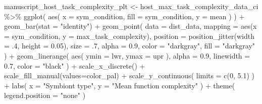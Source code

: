 \documentclass[
]{book}
\newenvironment{Shaded}{\begin{snugshade}}{\end{snugshade}}
\newcommand{\AttributeTok}[1]{\textcolor[rgb]{0.77,0.63,0.00}{#1}}
\newcommand{\DecValTok}[1]{\textcolor[rgb]{0.00,0.00,0.81}{#1}}
\newcommand{\FloatTok}[1]{\textcolor[rgb]{0.00,0.00,0.81}{#1}}
\newcommand{\FunctionTok}[1]{\textcolor[rgb]{0.00,0.00,0.00}{#1}}
\newcommand{\NormalTok}[1]{#1}
\newcommand{\OtherTok}[1]{\textcolor[rgb]{0.56,0.35,0.01}{#1}}
\newcommand{\SpecialCharTok}[1]{\textcolor[rgb]{0.00,0.00,0.00}{#1}}
\newcommand{\StringTok}[1]{\textcolor[rgb]{0.31,0.60,0.02}{#1}}
\begin{document}
\begin{Shaded}
\begin{Highlighting}[]
\NormalTok{manuscript\_host\_task\_complexity\_plt }\OtherTok{\textless{}{-}}\NormalTok{ host\_max\_task\_complexity\_data\_ci }\SpecialCharTok{\%\textgreater{}\%}
  \FunctionTok{ggplot}\NormalTok{(}
    \FunctionTok{aes}\NormalTok{(}
      \AttributeTok{x =}\NormalTok{ sym\_condition,}
      \AttributeTok{fill =}\NormalTok{ sym\_condition,}
      \AttributeTok{y =}\NormalTok{ mean}
\NormalTok{    )}
\NormalTok{  ) }\SpecialCharTok{+}
  \FunctionTok{geom\_bar}\NormalTok{(}\AttributeTok{stat =} \StringTok{"identity"}\NormalTok{) }\SpecialCharTok{+}
  \FunctionTok{geom\_point}\NormalTok{(}
    \AttributeTok{data =}\NormalTok{ dist\_data,}
    \AttributeTok{mapping =} \FunctionTok{aes}\NormalTok{(}\AttributeTok{x =}\NormalTok{ sym\_condition, }\AttributeTok{y =}\NormalTok{ max\_task\_complexity),}
    \AttributeTok{position =} \FunctionTok{position\_jitter}\NormalTok{(}\AttributeTok{width =}\NormalTok{ .}\DecValTok{4}\NormalTok{, }\AttributeTok{height =} \FloatTok{0.05}\NormalTok{),}
    \AttributeTok{size =}\NormalTok{ .}\DecValTok{7}\NormalTok{,}
    \AttributeTok{alpha =} \FloatTok{0.9}\NormalTok{,}
    \AttributeTok{color =} \StringTok{"darkgray"}\NormalTok{,}
    \AttributeTok{fill =} \StringTok{"darkgray"}
\NormalTok{  ) }\SpecialCharTok{+}
  \FunctionTok{geom\_linerange}\NormalTok{(}
    \FunctionTok{aes}\NormalTok{(}
      \AttributeTok{ymin =}\NormalTok{ lwr,}
      \AttributeTok{ymax =}\NormalTok{ upr}
\NormalTok{    ),}
    \AttributeTok{alpha =} \FloatTok{0.9}\NormalTok{,}
    \AttributeTok{linewidth =} \FloatTok{0.7}\NormalTok{,}
    \AttributeTok{color =} \StringTok{"black"}
\NormalTok{  ) }\SpecialCharTok{+}
  \FunctionTok{scale\_x\_discrete}\NormalTok{() }\SpecialCharTok{+}
  \FunctionTok{scale\_fill\_manual}\NormalTok{(}\AttributeTok{values=}\NormalTok{color\_pal) }\SpecialCharTok{+}
  \FunctionTok{scale\_y\_continuous}\NormalTok{(}
    \AttributeTok{limits =} \FunctionTok{c}\NormalTok{(}\DecValTok{0}\NormalTok{, }\FloatTok{5.1}\NormalTok{)}
\NormalTok{  ) }\SpecialCharTok{+}
  \FunctionTok{labs}\NormalTok{(}
    \AttributeTok{x =} \StringTok{"Symbiont type"}\NormalTok{,}
    \AttributeTok{y =} \StringTok{"Mean function complexity"}
\NormalTok{  ) }\SpecialCharTok{+}
  \FunctionTok{theme}\NormalTok{(}
    \AttributeTok{legend.position =} \StringTok{"none"}
\NormalTok{  )}
\end{Highlighting}
\end{Shaded}
\end{document}
